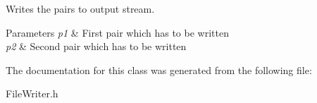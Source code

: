 Writes the pairs to output stream. 


\begin{DoxyParams}{Parameters}
{\em p1} & First pair which has to be written \\
\hline
{\em p2} & Second pair which has to be written \\
\hline
\end{DoxyParams}


The documentation for this class was generated from the following file\+:\begin{DoxyCompactItemize}
\item 
File\+Writer.\+h\end{DoxyCompactItemize}
